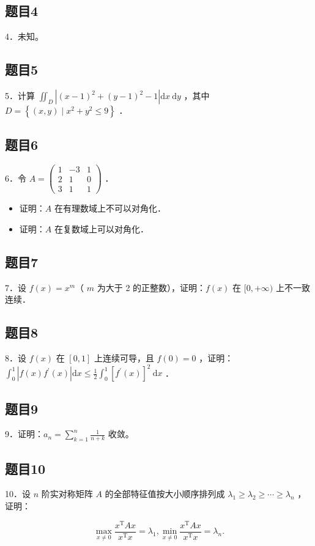 \documentclass{article}
\begin{document}
\subsection{题目4}
4．未知。

\subsection{题目5}
5．计算 \(\iint_{D}\left|(x-1)^{2}+(y-1)^{2}-1\right| \mathrm{d} x \mathrm{~d} y\) ，其中 \(D=\left\{(x, y) \mid x^{2}+y^{2} \leq 9\right\}\) ．

\subsection{题目6}
6．令 \(A=\left(\begin{array}{ccc}1 & -3 & 1 \\ 2 & 1 & 0 \\ 3 & 1 & 1\end{array}\right)\) ．

\begin{itemize}
  \item[（1）] 证明：\(A\) 在有理数域上不可以对角化．
  \item[（2）] 证明：\(A\) 在复数域上可以对角化．
\end{itemize}

\subsection{题目7}
7．设 \(f(x)=x^{m}\)（ \(m\) 为大于 2 的正整数），证明：\(f(x)\) 在 \([0,+\infty)\) 上不一致连续．

\subsection{题目8}
8．设 \(f(x)\) 在 \([0,1]\) 上连续可导，且 \(f(0)=0\) ，证明： \(\int_{0}^{1}\left|f(x) f^{\prime}(x)\right| \mathrm{d} x \leq \frac{1}{2} \int_{0}^{1}\left[f^{\prime}(x)\right]^{2} \mathrm{~d} x\) ．

\subsection{题目9}
9．证明：\(a_{n}=\sum_{k=1}^{n} \frac{1}{n+k}\) 收敛。

\subsection{题目10}
10．设 \(n\) 阶实对称矩阵 \(A\) 的全部特征值按大小顺序排列成 \(\lambda_{1} \geq \lambda_{2} \geq \cdots \geq \lambda_{n}\) ，证明：

\[
\max _{x \neq 0} \frac{x^{\mathrm{T}} A x}{x^{\mathrm{T}} x}=\lambda_{1}, \min _{x \neq 0} \frac{x^{\mathrm{T}} A x}{x^{\mathrm{T}} x}=\lambda_{n} .
\]
\end{document}
